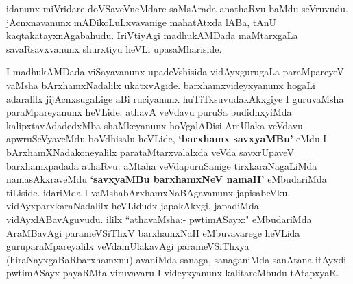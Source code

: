 \begin{artha}
idanunx miVridare doVSaveVneMdare \ndash saMsArada anathaRvu baMdu seVruvudu. jAcnxnavanunx 
mADikoLuLxvavanige mahatAtxda lABa, tAnU kaqtakatayxnAgabahudu. IriVtiyAgi madhukAMDada 
maMtarxgaLa savaRsavxvanunx shurxtiyu heVLi upasaMhariside.
\end{artha}




\centerline{}

\begin{artha}
I madhukAMDada viSayavanunx upadeVshisida vidAyxgurugaLa paraMpareyeV vaMsha bArxhamxNadalilx ukatxvAgide. barxhamxvideyxyanunx hogaLi adaralilx jijAcnxsugaLige aBi ruciyanunx huTiTxsuvudakAkxgiye I guruvaMsha paraMpareyanunx heVLide. athavA veVdavu puruSa budidhxyiMda kalipxtavAdadedxMba shaMkeyanunx hoVgalADisi AmUlaka veVdavu apwruSeVyaveMdu boVdhisalu heVLide, \textbf{`barxhamx savxyaMBu'}  eMdu I bArxhamXNadakoneyalilx parataMtarxvalalxda veVda savxrUpaveV barxhamxpadada athaRvu. aMtaha veVdapuruSanige tirxkaraNagaLiMda namasAkxraveMdu \textbf{`savxyaMBu barxhamxNeV namaH'} eMbudariMda tiLiside. idariMda I vaMshabArxhamxNaBAgavanunx japisabeVku. vidAyxparxkaraNadalilx heVLidudx japakAkxgi, japadiMda vidAyxlABavAguvudu. ililx ``athavaMsha:- pwtimASayx:" eMbudariMda AraMBavAgi parameVSiThxV barxhamxNaH eMbuvavarege heVLida guruparaMpareyalilx veVdamUlakavAgi parameVSiThxya (hiraNayxgaBaRbarxhamxnu) avaniMda sanaga, sanaganiMda sanAtana itAyxdi pwtimASayx payaRMta viruvavaru I videyxyanunx kalitareMbudu tAtapxyaR.
\end{artha}

\centerline{}

